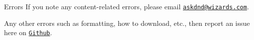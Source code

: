 \begin{DndComment}{Errors}
If you note any content-related errors, please email \href{mailto:askdnd@wizards.com}{\nolinkurl{askdnd@wizards.com}}.


Any other errors such as formatting, how to download, etc., then report an issue here on \href{https://github.com/jendave/fifth-edition-srd}{\nolinkurl{Github}}.
\end{DndComment}
